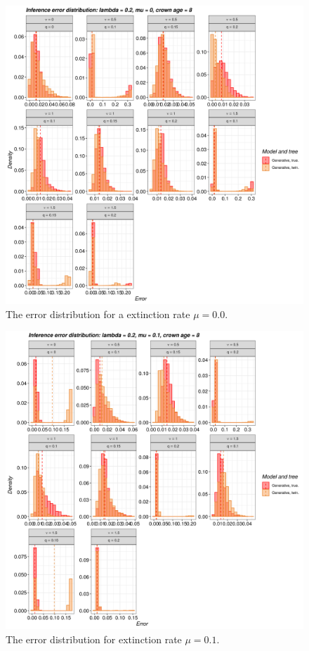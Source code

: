 \begin{figure}[!htbp]
  \includegraphics[width=\textwidth]{20200126_figure_1a.png}
  \caption{
    The error distribution for a extinction rate $\mu = 0.0$.
  }
  \label{fig:errors_yule}
\end{figure}

\begin{figure}[!htbp]
  \includegraphics[width=\textwidth]{20200126_figure_1b.png}
  \caption{
    The error distribution for extinction rate $\mu = 0.1$.
  }
  \label{fig:errors_bd}
\end{figure}

